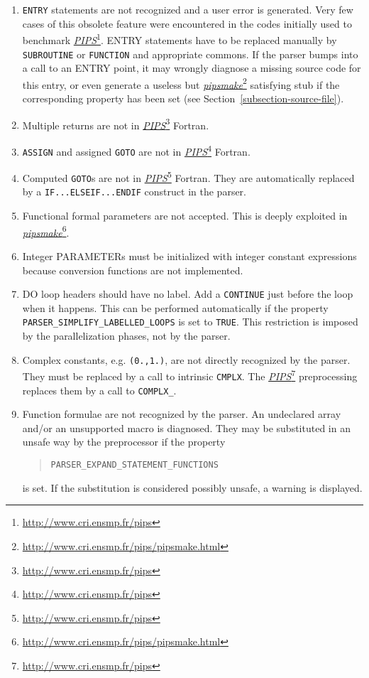 \documentclass[a4paper]{report}
\newcommand{\LINK}[2]{\href{#2}{#1}\footnote{\url{#2}}\xspace}
\newcommand{\PIPS}{\LINK{\emph{PIPS}}{http://www.cri.ensmp.fr/pips}}
\newcommand{\PIPSMAKE}{\LINK{\emph{pipsmake}}{http://www.cri.ensmp.fr/pips/pipsmake.html}\xspace}
\begin{document}
\begin{enumerate}

  \item \texttt{ENTRY} statements are not recognized and a user error is
generated. Very few cases of this obsolete feature were
encountered in the codes initially used to benchmark \PIPS{}. ENTRY statements have to be replaced manually by \texttt{SUBROUTINE} or
\texttt{FUNCTION} and appropriate commons.  If the parser bumps into a
call to an ENTRY point, it may wrongly diagnose a missing source code
for this entry, or even generate a useless but \PIPSMAKE{} satisfying stub if the corresponding
property has been set (see Section~\ref{subsection-source-file}).

  \item Multiple returns are not in \PIPS{} Fortran.

  \item \texttt{ASSIGN} and assigned \texttt{GOTO} are not in \PIPS{} Fortran.

  \item Computed \texttt{GOTO}s are not in \PIPS{} Fortran.
    They are automatically
    replaced by a \texttt{IF...ELSEIF...ENDIF} construct in the parser.

  \item Functional formal parameters are not accepted. This is deeply
    exploited in \PIPSMAKE.

  \item Integer PARAMETERs must be initialized with integer constant
    expressions because conversion functions are not implemented.

  \item DO loop headers should have no label. Add a \texttt{CONTINUE} just
    before the loop when it happens. This can be performed automatically if
    the property
    \verb/PARSER_SIMPLIFY_LABELLED_LOOPS/ is set to \texttt{TRUE}. This
    restriction is imposed by the parallelization phases, not by the parser.
 
  \item Complex constants, e.g. \texttt{(0.,1.)}, are not directly
    recognized by the
    parser. They must be replaced by a call to intrinsic \texttt{CMPLX}. The
    \PIPS{} preprocessing replaces them by a call to \texttt{COMPLX\_}.

  \item Function formulae are not recognized by the parser. An undeclared
    array and/or an
    unsupported macro is diagnosed. They may be substituted in an unsafe way
    by the preprocessor if the property
    \begin{quote}
      \verb/PARSER_EXPAND_STATEMENT_FUNCTIONS/
    \end{quote}
    is set. If the substitution is considered possibly unsafe, a warning is
    displayed.

\end{enumerate}
\end{document}
